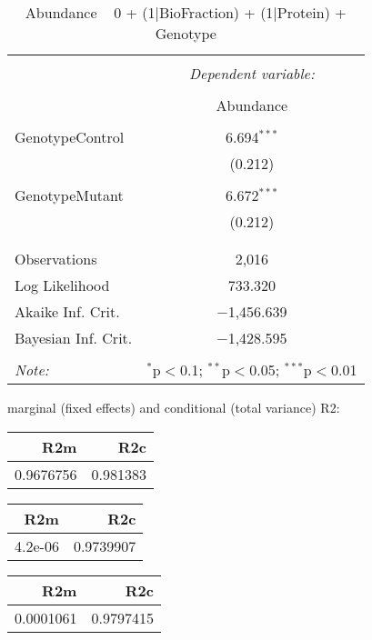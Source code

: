 \documentclass[11pt]{report}
\begin{document}
\begin{table}[!htbp] \centering 
  \caption{Abundance ~ 0 + (1|BioFraction) + (1|Protein) + Genotype} 
  \label{} 
\begin{tabular}{@{\extracolsep{5pt}}lc} 
\\[-1.8ex]\hline 
\hline \\[-1.8ex] 
 & \multicolumn{1}{c}{\textit{Dependent variable:}} \\ 
\cline{2-2} 
\\[-1.8ex] & Abundance \\ 
\hline \\[-1.8ex] 
 GenotypeControl & 6.694$^{***}$ \\ 
  & (0.212) \\ 
  & \\ 
 GenotypeMutant & 6.672$^{***}$ \\ 
  & (0.212) \\ 
  & \\ 
\hline \\[-1.8ex] 
Observations & 2,016 \\ 
Log Likelihood & 733.320 \\ 
Akaike Inf. Crit. & $-$1,456.639 \\ 
Bayesian Inf. Crit. & $-$1,428.595 \\ 
\hline 
\hline \\[-1.8ex] 
\textit{Note:}  & \multicolumn{1}{r}{$^{*}$p$<$0.1; $^{**}$p$<$0.05; $^{***}$p$<$0.01} \\ 
\end{tabular} 
\end{table} 
marginal (fixed effects) and conditional (total variance) R2:

\begin{tabular}{r|r}
\hline
R2m & R2c\\
\hline
0.9676756 & 0.981383\\
\hline
\end{tabular}

\begin{tabular}{r|r}
\hline
R2m & R2c\\
\hline
4.2e-06 & 0.9739907\\
\hline
\end{tabular}

\begin{tabular}{r|r}
\hline
R2m & R2c\\
\hline
0.0001061 & 0.9797415\\
\hline
\end{tabular}
\end{document}
